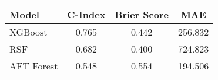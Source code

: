 \begin{tabular}{lccc}
\toprule
Model & C-Index & Brier Score & MAE \\
\midrule
XGBoost & 0.765 & 0.442 & 256.832 \\
RSF & 0.682 & 0.400 & 724.823 \\
AFT Forest & 0.548 & 0.554 & 194.506 \\
\bottomrule
\end{tabular}
